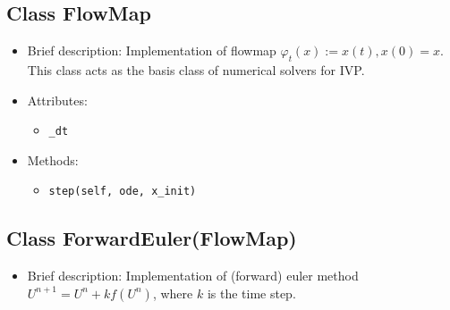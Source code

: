 \subsection{Class FlowMap}

\begin{itemize}
\item Brief description: Implementation of flowmap
  $\varphi_t(x) := x(t), x(0) = x$.
  This class acts as the basis class of numerical solvers
  for IVP.
\item Attributes:
  \begin{itemize}
  \item \lstinline|_dt|
  \end{itemize}
\item Methods:
  \begin{itemize}
  \item \lstinline|step(self, ode, x_init)|
  \end{itemize}
\end{itemize}

\subsection{Class ForwardEuler(FlowMap)}

\begin{itemize}
\item Brief description: Implementation of (forward) euler
  method $U^{n+1} = U^n + kf(U^n)$,
  where $k$ is the time step.
\end{itemize}



